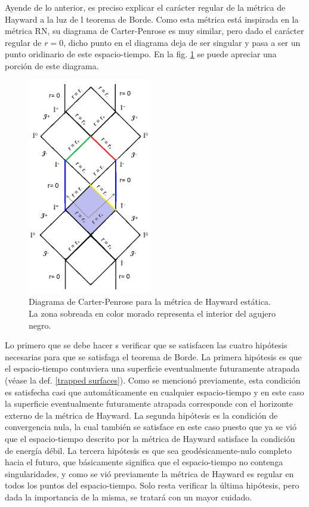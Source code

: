 \documentclass[16pt,a4paper]{article}
\numberwithin{equation}{section}
\theoremstyle{definition}
\begin{document}
Ayende de lo anterior, es preciso explicar el carácter regular de la métrica de Hayward a la luz de l teorema de Borde. Como esta métrica está inspirada en la métrica RN, su diagrama de Carter-Penrose es muy similar, pero dado el carácter regular de $r = 0$, dicho punto en el diagrama deja de ser singular y pasa a ser un punto oridinario de este espacio-tiempo. En la fig. \ref{fig: carter penrose diagram hayward} se puede apreciar una porción de este diagrama.\\
\begin{figure}[h!]
	\centering
	\includegraphics[width=0.48\textwidth,height=0.55\textheight]{CPDhayward2}
	\caption{Diagrama de Carter-Penrose para la métrica de Hayward estática. La zona sobreada en color morado representa el interior del agujero negro.}
	\label{fig: carter penrose diagram hayward}
\end{figure}

Lo primero que se debe hacer s verificar que se satisfacen las cuatro hipótesis necesarias para que se satisfaga el teorema de Borde. La primera hipótesis es que el espacio-tiempo contuviera una superficie eventualmente futuramente atrapada (véase la def. \ref*{trapped surfaces}). Como se mencionó previamente, esta condición es satisfecha casi que automáticamente en cualquier espacio-tiempo y en este caso la superficie eventualmente futuramente atrapada corresponde con el horizonte externo de la métrica de Hayward. La segunda hipótesis es la condición de convergencia nula, la cual también se satisface en este caso puesto que ya se vió que el espacio-tiempo descrito por la métrica de Hayward satisface la condición de energía débil. La tercera hipótesis es que sea geodésicamente-nulo completo hacia el futuro, que básicamente significa que el espacio-tiempo no contenga singularidades, y como se vió previamente la métrica de Hayward es regular en todos los puntos del espacio-tiempo. Solo resta verificar la última hipótesis, pero dada la importancia de la misma, se tratará con un mayor cuidado.\\
\end{document}
